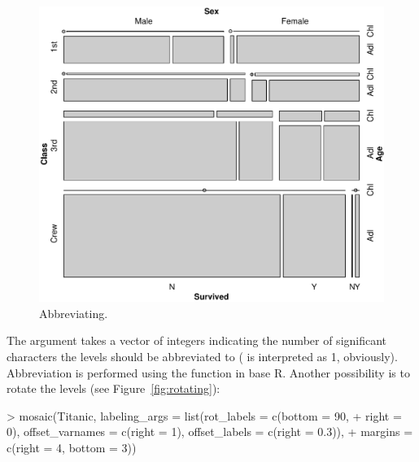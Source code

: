 \documentclass[a4paper]{article}
\newcommand{\codefun}[1]{\code{#1()}}
\begin{document}
\begin{figure}[h]
\begin{center}
\includegraphics{labeling-abbreviatingfig}
\caption{Abbreviating.}
\label{fig:abbreviating}
\end{center}
\end{figure}

\noindent The  argument takes a vector of
integers indicating the number of significant characters the levels should be
abbreviated to ( is interpreted as 1, obviously). Abbreviation
is performed using the \codefun{abbreviate} function in base {\sf R}. Another
possibility is to rotate the levels (see Figure~\ref{fig:rotating}):

\begin{Schunk}
\begin{Sinput}
> mosaic(Titanic, labeling_args = list(rot_labels = c(bottom = 90, 
+     right = 0), offset_varnames = c(right = 1), offset_labels = c(right = 0.3)), 
+     margins = c(right = 4, bottom = 3))
\end{Sinput}
\end{Schunk}
\end{document}

